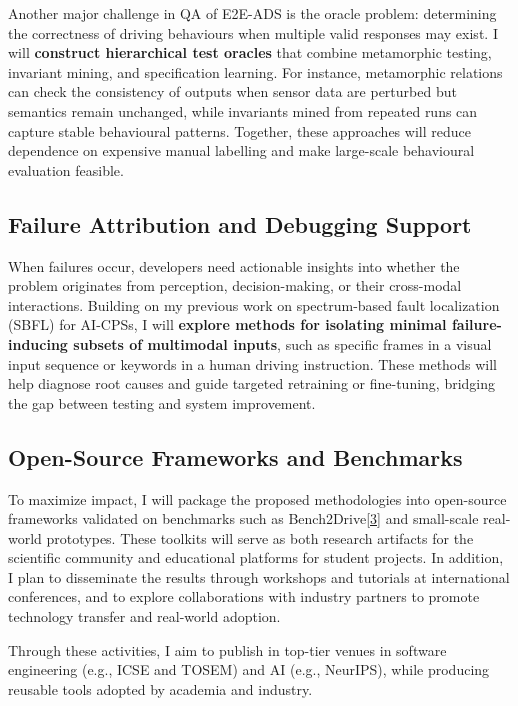 \documentclass[12pt,a4paper]{article}
\begin{document}
Another major challenge in QA of E2E-ADS is the oracle problem: determining the correctness of driving behaviours when multiple valid responses may exist. I will \textbf{construct hierarchical test oracles} that combine metamorphic testing, invariant mining, and specification learning. For instance, metamorphic relations can check the consistency of outputs when sensor data are perturbed but semantics remain unchanged, while invariants mined from repeated runs can capture stable behavioural patterns. Together, these approaches will reduce dependence on expensive manual labelling and make large-scale behavioural evaluation feasible.

\subsection{Failure Attribution and Debugging Support}

When failures occur, developers need actionable insights into whether the problem originates from perception, decision-making, or their cross-modal interactions. Building on my previous work on spectrum-based fault localization (SBFL) for AI-CPSs, I will \textbf{explore methods for isolating minimal failure-inducing subsets of multimodal inputs}, such as specific frames in a visual input sequence or keywords in a human driving instruction. These methods will help diagnose root causes and guide targeted retraining or fine-tuning, bridging the gap between testing and system improvement.

\subsection{Open-Source Frameworks and Benchmarks}

To maximize impact, I will package the proposed methodologies into open-source frameworks validated on benchmarks such as Bench2Drive\hyperlink{paper3}{[3]} and small-scale real-world prototypes. These toolkits will serve as both research artifacts for the scientific community and educational platforms for student projects. In addition, I plan to disseminate the results through workshops and tutorials at international conferences, and to explore collaborations with industry partners to promote technology transfer and real-world adoption.

Through these activities, I aim to publish in top-tier venues in software engineering (e.g., ICSE and TOSEM) and AI (e.g., NeurIPS), while producing reusable tools adopted by academia and industry.
\end{document}
